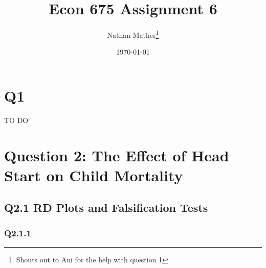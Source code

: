 \documentclass[11pt]{article}
\title{Econ 675 Assignment 6} %
\author{Nathan Mather\thanks{Shouts out to Ani for the help with question 1 }}  %
\date{\today} %
\begin{document}
	
\maketitle %

\setcounter{tocdepth}{2} %

\tableofcontents %



\section{Q1}

TO DO

\section{Question 2: The Effect of Head Start on Child Mortality}

\subsection{Q2.1 RD Plots and Falsification Tests}

\subsubsection{Q2.1.1}
\end{document}
